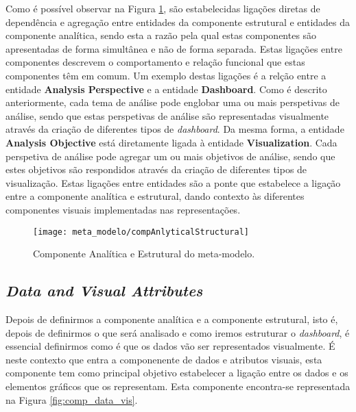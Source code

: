 Como é possível observar na Figura \ref{fig:comp_anal_struct}, são estabelecidas ligações diretas de dependência e agregação entre entidades da componente estrutural e entidades da componente analítica, sendo esta a razão pela qual estas componentes são apresentadas de forma simultânea e não de forma separada. Estas ligações entre componentes descrevem o comportamento e relação funcional que estas componentes têm em comum. Um exemplo destas ligações é a relção entre a entidade \textbf{Analysis Perspective} e a entidade \textbf{Dashboard}. Como é descrito anteriormente, cada tema de análise pode englobar uma ou mais perspetivas de análise, sendo que estas perspetivas de análise são representadas visualmente através da criação de diferentes tipos de \textit{dashboard}. Da mesma forma, a entidade \textbf{Analysis Objective} está diretamente ligada à entidade \textbf{Visualization}. Cada perspetiva de análise pode agregar um ou mais objetivos de análise, sendo que estes objetivos são respondidos através da criação de diferentes tipos de visualização. Estas ligações entre entidades são a ponte que estabelece a ligação entre a componente analítica e estrutural, dando contexto às diferentes componentes visuais implementadas nas representações.

\begin{figure}[htbp]
  \texttt{[image: meta\_modelo/compAnlyticalStructural]}
  \centering
  \caption{Componente Analítica e Estrutural do meta-modelo.}
  \label{fig:comp_anal_struct}
\end{figure}

\subsection{\textit{Data and Visual Attributes}} %
\label{sub:data_vis_attr}

Depois de definirmos a componente analítica e a componente estrutural, isto é, depois de definirmos o que será analisado e como iremos estruturar o \textit{dashboard}, é essencial definirmos como é que os dados vão ser representados visualmente. É neste contexto que entra a componenente de dados e atributos visuais, esta componente tem como principal objetivo estabelecer a ligação entre os dados e os elementos gráficos que os representam. Esta componente encontra-se representada na Figura \ref{fig:comp_data_vis}.

